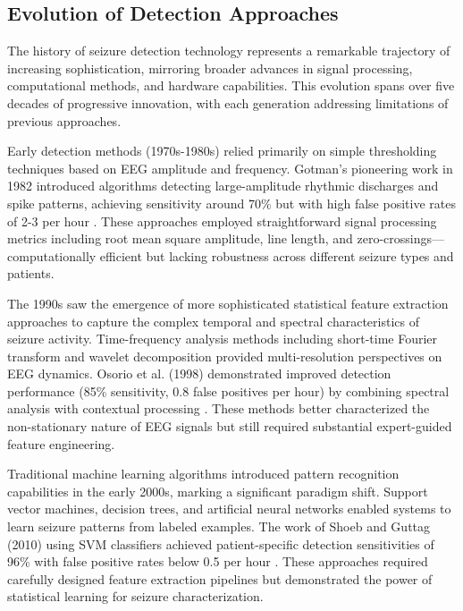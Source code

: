 \documentclass[pdflatex,sn-mathphys-num]{sn-jnl}%
\theoremstyle{thmstyleone}%
\theoremstyle{thmstyletwo}%
\theoremstyle{thmstylethree}%
\begin{document}
\subsection{Evolution of Detection Approaches}

The history of seizure detection technology represents a remarkable trajectory of increasing sophistication, mirroring broader advances in signal processing, computational methods, and hardware capabilities. This evolution spans over five decades of progressive innovation, with each generation addressing limitations of previous approaches.

Early detection methods (1970s-1980s) relied primarily on simple thresholding techniques based on EEG amplitude and frequency. Gotman’s pioneering work in 1982 introduced algorithms detecting large-amplitude rhythmic discharges and spike patterns, achieving sensitivity around 70\% but with high false positive rates of 2-3 per hour \citep{Gotman1982}. These approaches employed straightforward signal processing metrics including root mean square amplitude, line length, and zero-crossings—computationally efficient but lacking robustness across different seizure types and patients.

The 1990s saw the emergence of more sophisticated statistical feature extraction approaches to capture the complex temporal and spectral characteristics of seizure activity. Time-frequency analysis methods including short-time Fourier transform and wavelet decomposition provided multi-resolution perspectives on EEG dynamics. Osorio et al. (1998) demonstrated improved detection performance (85\% sensitivity, 0.8 false positives per hour) by combining spectral analysis with contextual processing \citep{Osorio1998}. These methods better characterized the non-stationary nature of EEG signals but still required substantial expert-guided feature engineering.

Traditional machine learning algorithms introduced pattern recognition capabilities in the early 2000s, marking a significant paradigm shift. Support vector machines, decision trees, and artificial neural networks enabled systems to learn seizure patterns from labeled examples. The work of Shoeb and Guttag (2010) using SVM classifiers achieved patient-specific detection sensitivities of 96\% with false positive rates below 0.5 per hour \citep{Shoeb2010}. These approaches required carefully designed feature extraction pipelines but demonstrated the power of statistical learning for seizure characterization.
\end{document}
